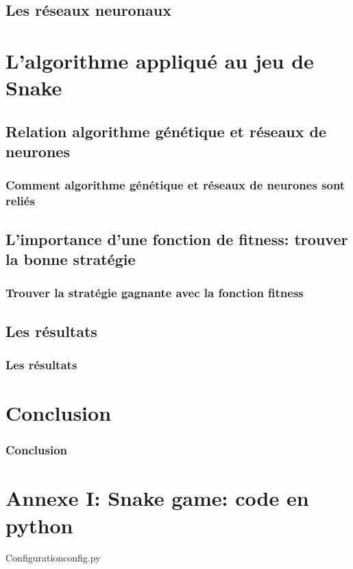 \documentclass[10pt]{beamer}
\begin{document}
  \subsection{Les réseaux neuronaux}
  

\section{L'algorithme appliqué au jeu de Snake}

\subsection{Relation algorithme génétique et réseaux de neurones}

\begin{frame}
  \frametitle{Comment algorithme génétique et réseaux de neurones sont reliés}
  
\end{frame}

\subsection{L'importance d'une fonction de fitness: trouver la bonne stratégie}

\begin{frame}
  \frametitle{Trouver la stratégie gagnante avec la fonction fitness}
\end{frame}

\subsection{Les résultats}

\begin{frame}
  \frametitle{Les résultats}
\end{frame}

\section{Conclusion}

\begin{frame}
  \frametitle{Conclusion}
\end{frame}

\section{Annexe I: \textbf{Snake game: code en python}}

\begin{frame}[t,allowframebreaks]{Configuration}{config.py}
\scriptsize
\inputminted[mathescape]{python}{../../snake-the-game/config.py}
\end{frame}
\end{document}
